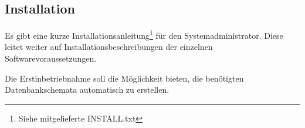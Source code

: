 \subsection{Installation}

\begin{description}
	 Es gibt eine kurze Installationsanleitung\footnote{Siehe mitgelieferte INSTALL.txt} für den Systemadministrator. Diese leitet weiter auf Installationsbeschreibungen der einzelnen Softwarevoraussetzungen.

	 Die Erstinbetriebnahme soll die Möglichkeit bieten, die benötigten Datenbankschemata automatisch zu erstellen.
\end{description}
